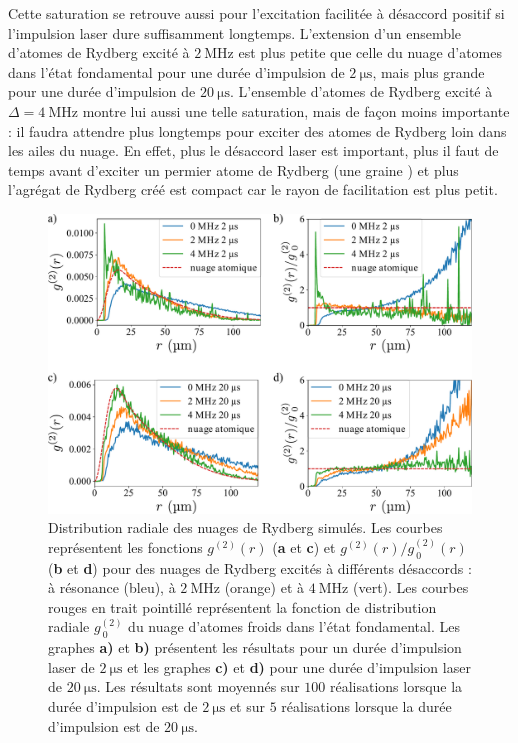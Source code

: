 Cette saturation se retrouve aussi pour l'excitation facilitée à désaccord positif si l'impulsion laser dure suffisamment longtemps.
L'extension d'un ensemble d'atomes de Rydberg excité à $\SI{2}{\MHz}$
est plus petite que celle du nuage d'atomes dans l'état fondamental pour une durée d'impulsion de $\SI{2}{\us}$, mais plus grande pour une durée d'impulsion de $\SI{20}{\us}$.
L'ensemble d'atomes de Rydberg excité à $\Delta=\SI{4}{\MHz}$ montre lui aussi une telle saturation, mais de façon moins importante : il faudra attendre plus longtemps pour exciter des atomes de Rydberg loin dans les ailes du nuage.
En effet, plus le désaccord laser est important, plus il faut de temps avant d'exciter un  permier atome de Rydberg (une \og graine \fg{}) et plus l'agrégat de Rydberg créé est compact car le rayon de facilitation est plus petit.

\begin{figure}[h]
\centering
\includegraphics[width=\linewidth]{figures/low_l/g2r_all}
\caption[Distribution radiale des nuages de Rydberg simulés]{
Distribution radiale des nuages de Rydberg simulés.
Les courbes représentent les fonctions $g^{(2)}(r)$ (\textbf{a} et \textbf{c}) et $g^{(2)}(r)/g^{(2)}_{~0}(r)$ (\textbf{b} et \textbf{d}) pour des nuages de Rydberg excités à différents désaccords : à résonance (bleu), à $\SI{2}{\MHz}$ (orange) et à $\SI{4}{\MHz}$ (vert).
Les courbes rouges en trait pointillé représentent la fonction de distribution radiale $g^{(2)}_{~0}$ du nuage d'atomes froids dans l'état fondamental.
Les graphes \textbf{a)} et \textbf{b)} présentent les résultats pour un durée d'impulsion laser de $\SI{2}{\us}$ et les graphes \textbf{c)} et \textbf{d)} pour une durée d'impulsion laser de $\SI{20}{\us}$.
Les résultats sont moyennés sur $100$ réalisations lorsque la durée d'impulsion est de $\SI{2}{\us}$ et sur $5$ réalisations lorsque la durée d'impulsion est de $\SI{20}{\us}$.
}
\label{fig:spatial_distrib_sim}
\end{figure}
%
%

